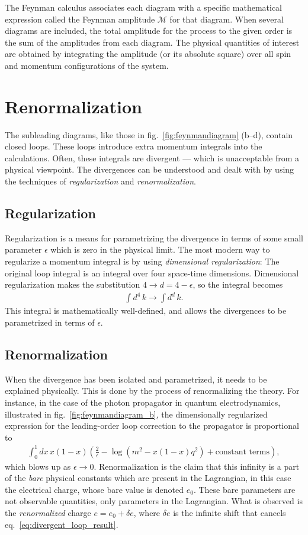 \documentclass[twoside,english]{uiofysmaster}
\begin{document}
The Feynman calculus associates each diagram with a specific mathematical expression called the Feynman amplitude $\mathcal{M}$ for that diagram. When several diagrams are included, the total amplitude for the process to the given order is the sum of the amplitudes from each diagram. The physical quantities of interest are obtained by integrating the amplitude (or its absolute square) over all spin and momentum configurations of the system.

\section{Renormalization}
\label{sec:renormalization}
The subleading diagrams, like those in fig.\  \ref{fig:feynmandiagram} (b--d), contain closed loops. These loops introduce extra momentum integrals into the calculations. Often, these integrals are divergent --- which is unacceptable from a physical viewpoint. The divergences can be understood and dealt with by using the techniques of {\it regularization} and {\it renormalization}. 
\subsection{Regularization}
Regularization is a means for parametrizing the divergence in terms of some small parameter $\epsilon$ which is zero in the physical limit. The most modern way to regularize a momentum integral is by using {\it dimensional regularization}: The original loop integral is an integral over four space-time dimensions. Dimensional regularization makes the substitution $4 \to d = 4-\epsilon$, so the integral becomes
\begin{align}
	\int d^4 \, k \to \int d^d \, k.
\end{align}
This integral is mathematically well-defined, and allows the divergences to be parametrized in terms of $\epsilon$.
\subsection{Renormalization}
When the divergence has been isolated and parametrized, it needs to be explained physically. This is done by the process of renormalizing the theory. For instance, in the case of the photon propagator in quantum electrodynamics, illustrated in fig.\ \ref{fig:feynmandiagram_b}, the dimensionally regularized expression for the leading-order loop correction to the propagator is proportional to
\begin{align}
	\int_0^1 dx \, x (1-x) \left( \frac{2}{\epsilon} - \log \left(m^2 - x(1-x)q^2 \right) + \mathrm{constant\,\, terms} \right), \label{eq:divergent_loop_result}
\end{align}
which blows up as $\epsilon\to 0$. Renormalization is the claim that this infinity is a part of the {\it bare} physical constants which are present in the Lagrangian, in this case the electrical charge, whose bare value is denoted $e_0$. These bare parameters are not observable quantities, only parameters in the Lagrangian. What is observed is the {\it renormalized} charge $e = e_0 + \delta e$, where $\delta e$ is the infinite shift that cancels eq.\ \eqref{eq:divergent_loop_result}.
\end{document}
